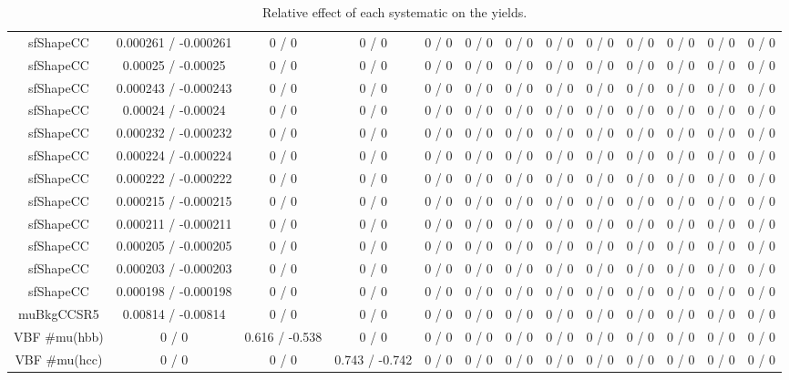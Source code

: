 \documentclass[10pt]{article}
\begin{document}
\begin{table}[htbp]
\begin{center}
\begin{tabular}{|c|c|c|c|c|c|c|c|c|c|c|c|c|}
  sfShapeCC & 0.000261 / -0.000261 & 0 / 0 & 0 / 0 & 0 / 0 & 0 / 0 & 0 / 0 & 0 / 0 & 0 / 0 & 0 / 0 & 0 / 0 & 0 / 0 & 0 / 0 \\ 
  sfShapeCC & 0.00025 / -0.00025 & 0 / 0 & 0 / 0 & 0 / 0 & 0 / 0 & 0 / 0 & 0 / 0 & 0 / 0 & 0 / 0 & 0 / 0 & 0 / 0 & 0 / 0 \\ 
  sfShapeCC & 0.000243 / -0.000243 & 0 / 0 & 0 / 0 & 0 / 0 & 0 / 0 & 0 / 0 & 0 / 0 & 0 / 0 & 0 / 0 & 0 / 0 & 0 / 0 & 0 / 0 \\ 
  sfShapeCC & 0.00024 / -0.00024 & 0 / 0 & 0 / 0 & 0 / 0 & 0 / 0 & 0 / 0 & 0 / 0 & 0 / 0 & 0 / 0 & 0 / 0 & 0 / 0 & 0 / 0 \\ 
  sfShapeCC & 0.000232 / -0.000232 & 0 / 0 & 0 / 0 & 0 / 0 & 0 / 0 & 0 / 0 & 0 / 0 & 0 / 0 & 0 / 0 & 0 / 0 & 0 / 0 & 0 / 0 \\ 
  sfShapeCC & 0.000224 / -0.000224 & 0 / 0 & 0 / 0 & 0 / 0 & 0 / 0 & 0 / 0 & 0 / 0 & 0 / 0 & 0 / 0 & 0 / 0 & 0 / 0 & 0 / 0 \\ 
  sfShapeCC & 0.000222 / -0.000222 & 0 / 0 & 0 / 0 & 0 / 0 & 0 / 0 & 0 / 0 & 0 / 0 & 0 / 0 & 0 / 0 & 0 / 0 & 0 / 0 & 0 / 0 \\ 
  sfShapeCC & 0.000215 / -0.000215 & 0 / 0 & 0 / 0 & 0 / 0 & 0 / 0 & 0 / 0 & 0 / 0 & 0 / 0 & 0 / 0 & 0 / 0 & 0 / 0 & 0 / 0 \\ 
  sfShapeCC & 0.000211 / -0.000211 & 0 / 0 & 0 / 0 & 0 / 0 & 0 / 0 & 0 / 0 & 0 / 0 & 0 / 0 & 0 / 0 & 0 / 0 & 0 / 0 & 0 / 0 \\ 
  sfShapeCC & 0.000205 / -0.000205 & 0 / 0 & 0 / 0 & 0 / 0 & 0 / 0 & 0 / 0 & 0 / 0 & 0 / 0 & 0 / 0 & 0 / 0 & 0 / 0 & 0 / 0 \\ 
  sfShapeCC & 0.000203 / -0.000203 & 0 / 0 & 0 / 0 & 0 / 0 & 0 / 0 & 0 / 0 & 0 / 0 & 0 / 0 & 0 / 0 & 0 / 0 & 0 / 0 & 0 / 0 \\ 
  sfShapeCC & 0.000198 / -0.000198 & 0 / 0 & 0 / 0 & 0 / 0 & 0 / 0 & 0 / 0 & 0 / 0 & 0 / 0 & 0 / 0 & 0 / 0 & 0 / 0 & 0 / 0 \\ 
  muBkgCCSR5 & 0.00814 / -0.00814 & 0 / 0 & 0 / 0 & 0 / 0 & 0 / 0 & 0 / 0 & 0 / 0 & 0 / 0 & 0 / 0 & 0 / 0 & 0 / 0 & 0 / 0 \\ 
  VBF #mu(hbb) & 0 / 0 & 0.616 / -0.538 & 0 / 0 & 0 / 0 & 0 / 0 & 0 / 0 & 0 / 0 & 0 / 0 & 0 / 0 & 0 / 0 & 0 / 0 & 0 / 0 \\ 
  VBF #mu(hcc) & 0 / 0 & 0 / 0 & 0.743 / -0.742 & 0 / 0 & 0 / 0 & 0 / 0 & 0 / 0 & 0 / 0 & 0 / 0 & 0 / 0 & 0 / 0 & 0 / 0 \\ 
\hline 
\end{tabular} 
\caption{Relative effect of each systematic on the yields.} 
\end{center} 
\end{table} 
\end{document}
